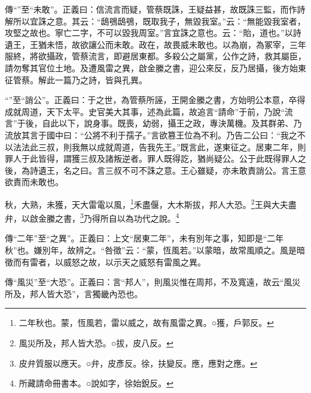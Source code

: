 {\noindent\zhuan{}\fzbyks 傳“”至“未敢”。正義曰：信流言而疑，管蔡既誅，王疑益甚，故既誅三監，而作詩解所以宜誅之意。其云：“鴟鴞鴟鴞，既取我子，無毀我室。”云：“無能毀我室者，攻堅之故也。寧亡二字，不可以毀我周室。”言宜誅之意也。云：“貽，道也。”以詩遺王，王猶未悟，故欲讓公而未敢。政在，故畏威未敢也。以為崩，為冢宰，三年服終，將欲攝政，管蔡流言，即避居東都。多殺公之屬黨，公作之詩，救其屬臣，請勿奪其官位土地。及遭風雷之異，啟金縢之書，迎公來反，反乃居攝，後方始東征管蔡。解此一篇乃之詩，皆與孔異。 \par}

{\noindent\shu{}\fzkt “”至“誚公”。正義曰：于之世，為管蔡所誣，王開金縢之書，方始明公本意，卒得成就周道，天下太平。史官美大其事，述為此篇，故追言“請命”于前，乃說“流言”于後，自此以下，說身事。既喪，幼弱，攝王之政，專決萬機。及其群弟、乃流放其言于國中曰：“公將不利于孺子。”言欲篡王位為不利。乃告二公曰：“我之不以法法此三叔，則我無以成就周道，告我先王。”既言此，遂東征之。居東二年，則罪人于此皆得，謂獲三叔及諸叛逆者。罪人既得訖，猶尚疑公。公于此既得罪人之後，為詩遺王，名之曰。言三叔不可不誅之意。王心雖疑，亦未敢責誚公。言王意欲責而未敢也。 \par}

秋，大熟，未獲，天大雷電以風，\footnote{二年秋也。蒙，恆風若，雷以威之，故有風雷之異。○獲，戶郭反。}禾盡偃，大木斯拔，邦人大恐。\footnote{風災所及，邦人皆大恐。○拔，皮八反。}王與大夫盡弁，以啟金縢之書，\footnote{皮弁質服以應天。○弁，皮彥反。徐，扶變反。應，應對之應。}乃得所自以為功代之說。\footnote{所藏請命冊書本。○說如字，徐始銳反。}


{\noindent\zhuan{}\fzbyks 傳“二年”至“之異”。正義曰：上文“居東二年”，未有別年之事，知即是“二年秋”也。嫌別年，故辨之。“咎徵”云：“蒙，恆風若。”以蒙暗，故常風順之。風是暗徵而有雷者，以威怒之故，以示天之威怒有雷風之異。 \par}

{\noindent\zhuan{}\fzbyks 傳“風災”至“大恐”。正義曰：言“邦人”，則風災惟在周邦，不及寬遠，故云“風災所及，邦人皆大恐”，言獨畿內恐也。 \par}

